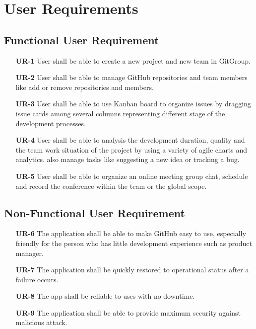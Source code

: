 \documentclass[12pt,a4paper]{report}
\begin{document}
\section{User Requirements}
	\subsection{Functional User Requirement}
		\begin{enumerate}
			\item[\textbf{UR-1}] User shall be able to create a new project and new team in GitGroup.
			\item[\textbf{UR-2}] User shall be able to manage GitHub repositories and team members like add or remove repositories and members.
			\item[\textbf{UR-3}] User shall be able to use Kanban board to organize issues by dragging issue cards among several columns representing different stage of the development processes.
			\item[\textbf{UR-4}] User shall be able to analysis the development duration, quality and the team work situation of the project by using a variety of agile charts and analytics.
			also manage tasks like suggesting a new idea or tracking a bug. 
			\item[\textbf{UR-5}] User shall be able to organize an online meeting group chat, schedule and record the conference within the team or the global scope.
		\end{enumerate}
	\subsection{Non-Functional User Requirement}
		\begin{enumerate}
			\item[\textbf{UR-6}] The application shall be able to make GitHub easy to use, especially friendly for the person who has little development experience such as product manager.
			\item[\textbf{UR-7}] The application shall be quickly restored to operational status after a failure occurs.
			\item[\textbf{UR-8}] The app shall be reliable to uses with no downtime.
			\item[\textbf{UR-9}] The application shall be able to provide maximum security against malicious attack.
		\end{enumerate}
\end{document}
